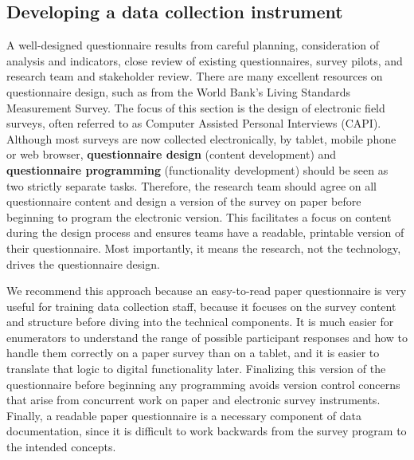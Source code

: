 \subsection{Developing a data collection instrument}

A well-designed questionnaire results from careful planning,
consideration of analysis and indicators,
close review of existing questionnaires,
survey pilots, and research team and stakeholder review.
There are many excellent resources on questionnaire design,
such as from the World Bank's Living Standards Measurement Survey.\cite{glewwe2000designing}
The focus of this section is the design of electronic field surveys,
often referred to as Computer Assisted Personal Interviews (CAPI).
Although most surveys are now collected electronically, by tablet, mobile phone or web browser,
\textbf{questionnaire design}
(content development) and \textbf{questionnaire programming}
(functionality development) should be seen as two strictly separate tasks.
Therefore, the research team should agree on all questionnaire content
and design a version of the survey on paper
before beginning to program the electronic version.
This facilitates a focus on content during the design process
and ensures teams have a readable, printable version of their questionnaire.
Most importantly, it means the research, not the technology,
drives the questionnaire design.

We recommend this approach because an easy-to-read paper questionnaire
is very useful for training data collection staff,
because it focuses on the survey content and structure
before diving into the technical components.
It is much easier for enumerators to understand
the range of possible participant responses
and how to handle them correctly on a paper survey than on a tablet,
and it is easier to translate that logic to digital functionality later.
Finalizing this version of the questionnaire before beginning any programming
avoids version control concerns that arise from concurrent work
on paper and electronic survey instruments.
Finally, a readable paper questionnaire is a necessary component of data documentation,
since it is difficult to work backwards from the survey program to the intended concepts.

